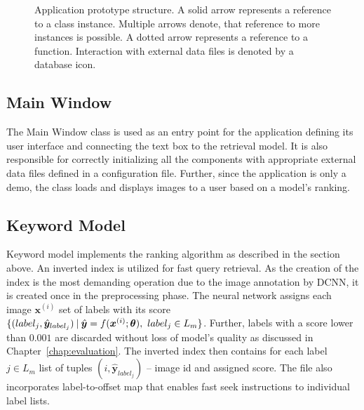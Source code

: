 \begin{figure}[ht]
	\centering
	
	
	\caption[Application prototype structure]{Application prototype structure. A solid arrow represents a reference to a class instance. Multiple arrows denote, that reference to more instances is possible. A dotted arrow represents a reference to a function. Interaction with external data files is denoted by a database icon.}
	\label{fig:wpf_app}
\end{figure}

\subsection{Main Window}
The Main Window class is used as an entry point for the application defining its user interface and connecting the text box to the retrieval model. It is also responsible for correctly initializing all the components with appropriate external data files defined in a configuration file. Further, since the application is only a demo, the class loads and displays images to a user based on a model's ranking.


\subsection{Keyword Model}
Keyword model implements the ranking algorithm as described in the section above. An inverted index is utilized for fast query retrieval. As the creation of the index is the most demanding operation due to the image annotation by DCNN, it is created once in the preprocessing phase. The neural network assigns each image $\bm{x}^{(i)}$ set of labels with its score $\{(label_j,\hat{\bm{y}}_{label_j})\:\vert\:{\hat{\bm{y}}=f(\bm{x}^{(i)};\bm{\theta})},\  {label_j\in L_m}\}$. Further, labels with a score lower than $0.001$ are discarded without loss of model's quality as discussed in Chapter~\ref{chap:evaluation}. The inverted index then contains for each label $j\in L_m$ list of tuples $(i, \hat{\bm{y}}_{label_j})$ -- image id and assigned score. The file also incorporates label-to-offset map that enables fast seek instructions to individual label lists.

